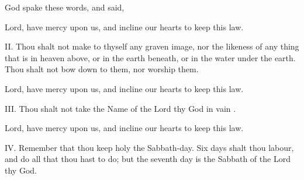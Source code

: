 \bigskip


\bigskip






\smallskip

\centerline{God spake these words, and said,}

\R Lord, have mercy upon us, and incline our hearts to keep this law.

II. Thou shalt not make to thyself any graven image, nor the likeness of any thing that is in heaven above, or in the earth beneath, or in the water under the earth. Thou shalt not bow down to them, nor worship them.%

\R Lord, have mercy upon us, and incline our hearts to keep this law.

III. Thou shalt not take the Name of the Lord thy God in vain%
.

\R Lord, have mercy upon us, and incline our hearts to keep this law.

IV. Remember that thou keep holy the Sabbath-day. Six days shalt thou labour, and do all that thou hast to do; but the seventh day is the Sabbath of the Lord thy God.%

